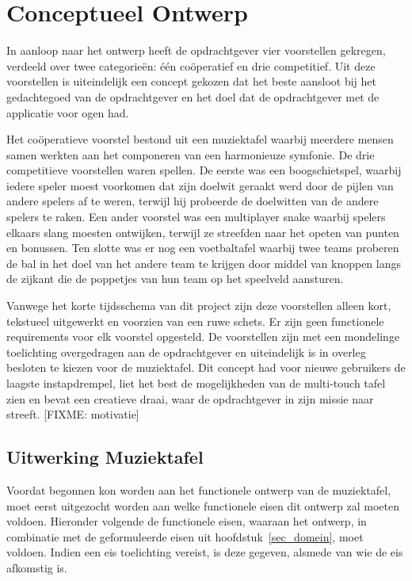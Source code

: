 \documentclass{acm}
\begin{document}
\section{Conceptueel Ontwerp}
\label{sec_concept}
In aanloop naar het ontwerp heeft de opdrachtgever vier voorstellen gekregen, verdeeld over twee categorie\"en: \'e\'en co\"operatief en drie competitief. Uit deze voorstellen is uiteindelijk een concept gekozen dat het beste aansloot bij het gedachtegoed van de opdrachtgever en het doel dat de opdrachtgever met de applicatie voor ogen had.

Het co\"operatieve voorstel bestond uit een muziektafel waarbij meerdere mensen samen werkten aan het componeren van een harmonieuze symfonie. De drie competitieve voorstellen waren spellen. De eerste was een boogschietspel, waarbij iedere speler moest voorkomen dat zijn doelwit geraakt werd door de pijlen van andere spelers af te weren, terwijl hij probeerde de doelwitten van de andere spelers te raken. Een ander voorstel was een multiplayer snake waarbij spelers elkaars slang moesten ontwijken, terwijl ze streefden naar het opeten van punten en bonussen. Ten slotte was er nog een voetbaltafel waarbij twee teams proberen de bal in het doel van het andere team te krijgen door middel van knoppen langs de zijkant die de poppetjes van hun team op het speelveld aansturen.

Vanwege het korte tijdsschema van dit project zijn deze voorstellen alleen kort, tekstueel uitgewerkt en voorzien van een ruwe schets. Er zijn geen functionele requirements voor elk voorstel opgesteld. De voorstellen zijn met een mondelinge toelichting overgedragen aan de opdrachtgever en uiteindelijk is in overleg besloten te kiezen voor de muziektafel. Dit concept had voor nieuwe gebruikers de laagste instapdrempel, liet het best de mogelijkheden van de multi-touch tafel zien en bevat een creatieve draai, waar de opdrachtgever in zijn missie naar streeft. [FIXME: motivatie]

\subsection{Uitwerking Muziektafel}
Voordat begonnen kon worden aan het functionele ontwerp van de muziektafel, moet eerst uitgezocht worden aan welke functionele eisen dit ontwerp zal moeten voldoen. Hieronder volgende de functionele eisen, waaraan het ontwerp, in combinatie met de geformuleerde eisen uit hoofdstuk~\ref{sec_domein}, moet voldoen. Indien een eis toelichting vereist, is deze gegeven, alsmede van wie de eis afkomstig is.
\end{document}
